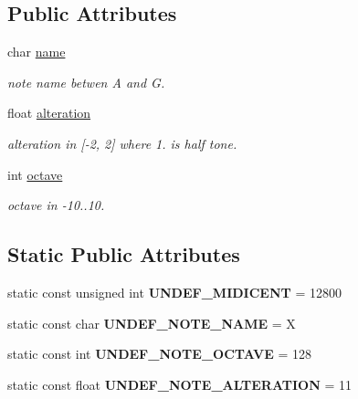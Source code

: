 \subsection*{Public Attributes}
\begin{DoxyCompactItemize}
\item 
\mbox{\label{classPitch_a7a7649ed78c05c1ff5f77c69155f1a71}} 
char \mbox{\hyperlink{classPitch_a7a7649ed78c05c1ff5f77c69155f1a71}{name}}
\begin{DoxyCompactList}\small\item\em note name betwen \textquotesingle{}A\textquotesingle{} and \textquotesingle{}G\textquotesingle{}. \end{DoxyCompactList}\item 
\mbox{\label{classPitch_a6df5b9a06778d903d95924f122dc8783}} 
float \mbox{\hyperlink{classPitch_a6df5b9a06778d903d95924f122dc8783}{alteration}}
\begin{DoxyCompactList}\small\item\em alteration in \mbox{[}-\/2, 2\mbox{]} where 1. is half tone. \end{DoxyCompactList}\item 
\mbox{\label{classPitch_a3ed3edd50bc2bfa0e1d5c63df4dc6c7a}} 
int \mbox{\hyperlink{classPitch_a3ed3edd50bc2bfa0e1d5c63df4dc6c7a}{octave}}
\begin{DoxyCompactList}\small\item\em octave in -\/10..10. \end{DoxyCompactList}\end{DoxyCompactItemize}
\subsection*{Static Public Attributes}
\begin{DoxyCompactItemize}
\item 
static const unsigned int {\bfseries U\+N\+D\+E\+F\+\_\+\+M\+I\+D\+I\+C\+E\+NT} = 12800
\item 
static const char {\bfseries U\+N\+D\+E\+F\+\_\+\+N\+O\+T\+E\+\_\+\+N\+A\+ME} = \textquotesingle{}X\textquotesingle{}
\item 
static const int {\bfseries U\+N\+D\+E\+F\+\_\+\+N\+O\+T\+E\+\_\+\+O\+C\+T\+A\+VE} = 128
\item 
static const float {\bfseries U\+N\+D\+E\+F\+\_\+\+N\+O\+T\+E\+\_\+\+A\+L\+T\+E\+R\+A\+T\+I\+ON} = 11
\end{DoxyCompactItemize}

